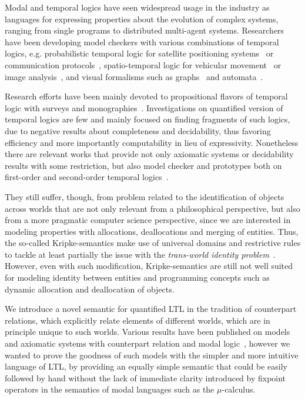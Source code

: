 Modal and temporal logics have seen widespread usage in the industry as languages for expressing properties about the
evolution of complex systems, ranging from single programs to distributed multi-agent systems. Researchers have been
developing model checkers with various combinations of temporal logics, e.g. probabilistic temporal logic for satellite
positioning systems~\cite{lu_availability_2014} or communication protocols~\cite{ammar_formal_2011}, spatio-temporal
logic for vehicular movement~\cite{ciancia_spatio-temporal_2018} or image analysis~\cite{vojnar_voxlogica_2019}, and
visual formalisms such as graphs~\cite{fiadeiro_temporal_2007} and automata~\cite{montanari_structured_2005}.

Research efforts have been mainly devoted to propositional flavors of temporal logic with surveys and
monographies~\cite{pnueli_temporal_1977,kroger_temporal_2008}. Investigations on quantified version of temporal logics
are few and mainly focused on finding fragments of such logics, due to negative results about completeness and
decidability, thus favoring efficiency and more importantly computability in lieu of expressivity. Nonetheless there are
relevant works that provide not only axiomatic systems or decidability results with some restriction, but also model
checker and prototypes both on first-order and second-order temporal
logics~\cite{boneva_graph_2007,hutchison_model_2006,baeza-yates_model_2002}.

They still suffer, though, from problem related to the identification of objects across worlds that are not only
relevant from a philosophical perspective, but also from a more pragmatic computer science perspective, since we are
interested in modeling properties with allocations, deallocations and merging of entities. Thus, the so-called
Kripke-semantics make use of universal domains and restrictive rules to tackle at least partially the issue with the
\emph{trans-world identity problem}~\cite{lewis_plurality_2001}. However, even with such modification, Kripke-semantics
are still not well suited for modeling identity between entities and programming concepts such as dynamic allocation and
deallocation of objects.

We introduce a novel semantic for quantified \ac{LTL} in the tradition of counterpart relations, which explicitly relate
elements of different worlds, which are in principle unique to such worlds. Various results have been published on
models and axiomatic systems with counterpart relation and modal
logic~\cite{hutchison_counterpart_2010,belardinelli_quantified_2021}, however we wanted to prove the goodness of such
models with the simpler and more intuitive language of \ac{LTL}, by providing an equally simple semantic that could be
easily followed by hand without the lack of immediate clarity introduced by fixpoint operators in the semantics of modal
languages such as the $\mu$-calculus.

